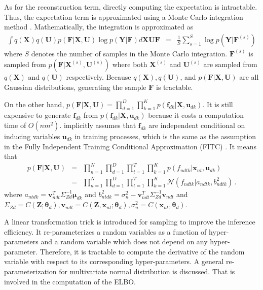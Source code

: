 \documentclass{article}
\begin{document}
As for the reconstruction term, directly computing the expectation is intractable. Thus, the expectation term is approximated using a Monte Carlo integration method \citep{Gal_2015}. Mathematically, the integration is approximated as
\begin{eqnarray}
\int q(\bm X) q(\bm U)p(\bm F|\bm X, \bm U)\log p(\bm Y|\bm F) d\bm X\bm U\bm F & = & \frac{1}{S}\sum_{s = 1}^{S} \log p(\bm Y| \bm F^{(s)})
\end{eqnarray}
where $S$ denotes the number of samples in the Monte Carlo integration. $\bm F^{(s)} $ is sampled from $p(\bm F| \bm X^{(s)}, \bm U^{(s)})$ where both $\bm X^{(s)}$ and $\bm U^{(s)}$ are sampled from $q(\bm X)$ and $q(\bm U)$ respectively. Because $q(\bm X), q(\bm U)$, and $p(\bm F| \bm X, \bm U)$ are all Gaussian distributions, generating the sample $\bm F$ is tractable. 

On the other hand, $p(\bm F | \bm X, \bm U) = \prod_{d = 1}^{D}\prod_{k = 1}^{K}p(\bm f_{dk}| \bm X, \bm u_{dk})$. It is still expensive to generate $\bm f_{dk}$ from $p(\bm f_{dk}| \bm X, \bm u_{dk})$ because it costs a computation time of $O(nm^2)$. \cite{Gal_2015} implicitly assumes that $\bm f_{dk}$ are independent conditional on inducing variables $\bm u_{dk}$ in training processes, which is the same as the assumption in the Fully Independent Training Conditional Approximation (FITC) \citep{Rasmussen_2005}. It means that
\begin{eqnarray}
p(\bm F | \bm X, \bm U) & = & \prod_{n= 1}^{N}\prod_{d = 1}^{D}\prod_{t = 1}^{T}\prod_{k = 1}^{K}p(f_{ndtk}| \bm x_{nt}, \bm u_{dk}) \nonumber \\
& = & \prod_{n= 1}^{N}\prod_{d = 1}^{D}\prod_{t = 1}^{T}\prod_{k = 1}^{K}\mathcal{N}(f_{ndtk}| a_{ndtk}, b_{ndtk}^2) \,. 
\label{f_decomposition}
\end{eqnarray}
where $a_{ntdk} = \bm v_{ndt}^T\Sigma_{Zd}^{-1}\bm\mu_{dk}$ and $b_{ntdk}^2 = \sigma_n^2 - \bm v_{ndt}^T\Sigma_{Zd}^{-1}\bm v_{ndt}$ and $\Sigma_{Zd} = C(\bm Z; \bm{\theta}_d), \bm v_{ndt} = C(\bm Z, \bm x_{nt}; \bm{\theta}_d), \sigma_n^2 = C(\bm x_{nt}, \bm{\theta}_d)$.

A linear transformation trick \citep{Kingma_2013} is introduced for sampling to improve the inference efficiency. It re-parameterizes a random variables as a function of hyper-parameters and a random variable which does not depend on any hyper-parameter. Therefore, it is tractable to compute the derivative of the random variable with respect to its corresponding hyper-parameters. A general re-parameterization for multivariate normal distribution is discussed. That is involved in the computation of the ELBO. 
\end{document}
